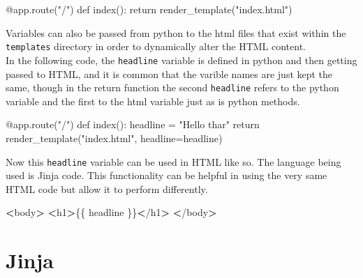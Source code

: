 \documentclass[]{book}
\newenvironment{Shaded}{\begin{snugshade}}{\end{snugshade}}
\newcommand{\BuiltInTok}[1]{#1}
\newcommand{\ExtensionTok}[1]{#1}
\newcommand{\NormalTok}[1]{#1}
\newcommand{\OperatorTok}[1]{\textcolor[rgb]{0.81,0.36,0.00}{\textbf{#1}}}
\newcommand{\StringTok}[1]{\textcolor[rgb]{0.31,0.60,0.02}{#1}}
\begin{document}
\begin{Shaded}
\begin{Highlighting}[]
\ExtensionTok{@app.route}\NormalTok{(}\StringTok{"/"}\NormalTok{)}
\ExtensionTok{def}\NormalTok{ index()}\BuiltInTok{:}
    \BuiltInTok{return}\NormalTok{ render_template(}\StringTok{"index.html"}\NormalTok{)}
\end{Highlighting}
\end{Shaded}

Variables can also be passed from python to the html files that exist within the \texttt{templates} directory in order to dynamically alter the HTML content.\\
In the following code, the \texttt{headline} variable is defined in python and then getting passed to HTML, and it is common that the varible names are just kept the same, though in the return function the second \texttt{headline} refers to the python variable and the first to the html variable just as is python methods.

\begin{Shaded}
\begin{Highlighting}[]
\ExtensionTok{@app.route}\NormalTok{(}\StringTok{"/"}\NormalTok{)}
\ExtensionTok{def}\NormalTok{ index()}\BuiltInTok{:}
    \ExtensionTok{headline}\NormalTok{ = }\StringTok{"Hello thar"}
    \BuiltInTok{return}\NormalTok{ render_template(}\StringTok{"index.html"}\NormalTok{, headline=headline)}
\end{Highlighting}
\end{Shaded}

Now this \texttt{headline} variable can be used in HTML like so. The language being used is Jinja code. This functionality can be helpful in using the very same HTML code but allow it to perform differently.

\begin{Shaded}
\begin{Highlighting}[]
\OperatorTok{<}\ExtensionTok{body}\OperatorTok{>}
    \OperatorTok{<}\ExtensionTok{h1}\OperatorTok{>}\NormalTok{\{\{ headline \}\}}\OperatorTok{<}\NormalTok{/}\ExtensionTok{h1}\OperatorTok{>}
\OperatorTok{<}\NormalTok{/}\ExtensionTok{body}\OperatorTok{>}
\end{Highlighting}
\end{Shaded}

\hypertarget{jinja}{%
\section{Jinja}\label{jinja}}
\end{document}
